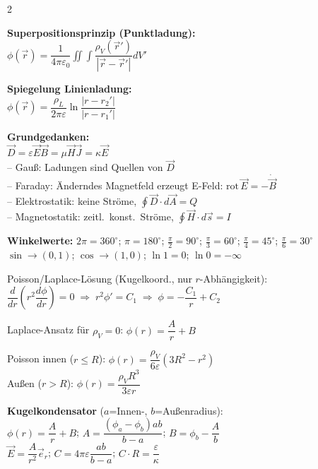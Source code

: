 \documentclass[a4paper, 7.5pt]{extarticle}
\begin{document}
\begin{multicols*}{2}
\begin{tcolorbox}[title={Weitere Körper}, colback=white, colframe=boxtitle]
\textbf{Superpositionsprinzip (Punktladung):}\\
$\phi(\vec{r})=\dfrac{1}{4\pi\varepsilon_0}\displaystyle\iint\displaystyle\int\dfrac{\rho_V(\vec{r}')}{|\vec{r}-\vec{r}'|}dV'$

\textbf{Spiegelung Linienladung:}\\
$\phi(\vec{r})=\dfrac{\rho_L}{2\pi\varepsilon}\ln\!\dfrac{|r-r_2'|}{|r-r_1'|}$
\end{tcolorbox}


\begin{tcolorbox}[title={Grundlagen \& Konstanten (Erg\"anzung)}, colback=white, colframe=boxtitle]
\textbf{Grundgedanken:}\\
$\vec{D}=\varepsilon\vec{E}$\quad $\vec{B}=\mu\vec{H}$\quad $\vec{J}=\kappa\vec{E}$\\
-- Gau\ss{}: Ladungen sind Quellen von $\vec{D}$\\
-- Faraday: \"Anderndes Magnetfeld erzeugt E-Feld: $\mathrm{rot}\,\vec{E}=-\dot{\vec{B}}$\\
-- Elektrostatik: keine Str\"ome, $\oint\vec{D}\cdot d\vec{A}=Q$\\
-- Magnetostatik: zeitl.\ konst.\ Str\"ome, $\oint\vec{H}\cdot d\vec{s}=I$

\textbf{Winkelwerte:}
$2\pi{=}360^\circ$;\; $\pi{=}180^\circ$;\; $\frac{\pi}{2}{=}90^\circ$;\; $\frac{\pi}{3}{=}60^\circ$;\; $\frac{\pi}{4}{=}45^\circ$;\; $\frac{\pi}{6}{=}30^\circ$\\
$\sin\to(0{,}1)$;\; $\cos\to(1{,}0)$;\; $\ln1=0$;\; $\ln0=-\infty$
\end{tcolorbox}

\begin{tcolorbox}[title={Potential: homogen geladene Kugel}, colback=white, colframe=boxtitle]
Poisson/Laplace-L\"osung (Kugelkoord., nur $r$-Abh\"angigkeit):\\
$\dfrac{d}{dr}\!\left(r^2\dfrac{d\phi}{dr}\right)=0\;\Rightarrow\; r^2\phi'=C_1\;\Rightarrow\;\phi=-\dfrac{C_1}{r}+C_2$

Laplace-Ansatz f\"ur $\rho_V=0$: $\phi(r)=\dfrac{A}{r}+B$

Poisson innen ($r\leq R$): $\phi(r)=\dfrac{\rho_V}{6\varepsilon}(3R^2-r^2)$\\
Au\ss{}en ($r>R$): $\phi(r)=\dfrac{\rho_V R^3}{3\varepsilon r}$

\textbf{Kugelkondensator} ($a$=Innen-, $b$=Au\ss{}enradius):\\
$\phi(r)=\dfrac{A}{r}+B$;\; $A=\dfrac{(\phi_a-\phi_b)ab}{b-a}$;\; $B=\phi_b-\dfrac{A}{b}$\\
$\vec{E}=\dfrac{A}{r^2}\vec{e}_r$;\; $C=4\pi\varepsilon\dfrac{ab}{b-a}$;\; $C\cdot R=\dfrac{\varepsilon}{\kappa}$
\end{tcolorbox}


\end{multicols*}
\end{document}
